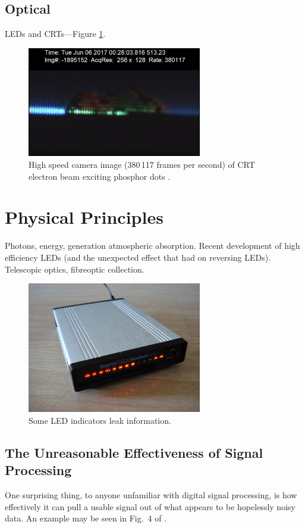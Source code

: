\documentclass[a4paper,twoside,11pt]{book}
\begin{document}
\subsection{Optical}
LEDs and CRTs---Figure \ref{figure:slow-mo_guys_crt}.
\begin{figure}[ht]
  \centering
  \includegraphics[width=3in]{slow-mo_guys_crt.png}
  \caption{High speed camera image (380\,117 frames per second) of CRT electron
    beam exciting phosphor dots \protect\cite{Free2018}.}
  \label{figure:slow-mo_guys_crt}
\end{figure}
\section{Physical Principles}
Photons, energy, generation atmospheric absorption. Recent development of
high efficiency LEDs (and the unexpected effect that had on reversing LEDs).
Telescopic optics, fibreoptic collection.
\begin{figure}[ht]
  \centering
  \includegraphics[width=3in]{SupraFAXmodem_144_LC_photo_courtesy_Wikipedia.jpg}
  \caption{Some LED indicators leak information.}
  \label{figure:modem}
\end{figure}
\subsection{The Unreasonable Effectiveness of Signal Processing}
One surprising thing, to anyone unfamiliar with digital signal processing, is
how effectively it can pull a usable signal out of what appears to be
hopelessly noisy data. An example may be seen in Fig.\ 4 of
\cite{Loughry2002a}.
\end{document}
